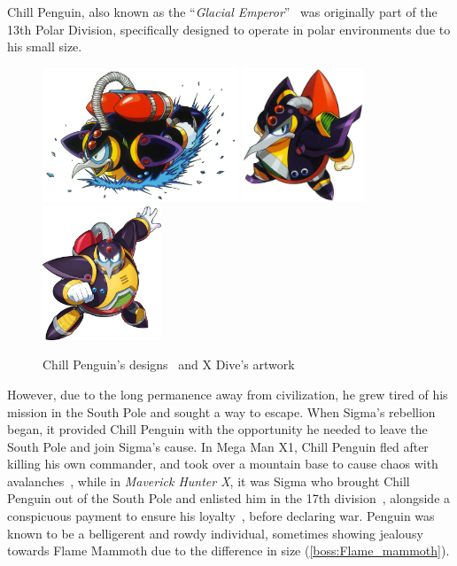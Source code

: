 Chill Penguin, also known as the ``\textit{Glacial Emperor}''~\cite{book:MMX_Complete_art} was originally part of the 13th Polar Division, specifically designed to operate in polar environments due to his small size. 
\begin{figure}[htp]
	\centering
	\includegraphics[height=4cm]{figures/X1/Chill_penguin/Chill_Penguin.jpg}
	\includegraphics[height=4cm]{figures/X1/Chill_penguin/MHXChillPenguin.jpg}
	\includegraphics[height=4cm]{figures/X1/Chill_penguin/Chill_Penguin.png}
	\caption{Chill Penguin's designs~\cite{book:MMX_Complete_art} and X Dive's artwork}
\end{figure}However, due to the long permanence away from civilization, he grew tired of his mission in the South Pole and sought a way to escape. When Sigma's rebellion began, it provided Chill Penguin with the opportunity he needed to leave the South Pole and join Sigma's cause. In Mega Man X1, Chill Penguin fled  after killing his own commander, and took over a mountain base to cause chaos with avalanches~\cite{Xcoll1:Manual_X1}, while in \textit{Maverick Hunter X}, it was Sigma who brought Chill Penguin out of the South Pole and enlisted him in the 17th division~\cite{MHX:manual}, alongside a conspicuous payment to ensure his loyalty~\cite{wiki:MMX_script}, before declaring war. Penguin was known to be a belligerent and rowdy individual, sometimes showing jealousy towards Flame Mammoth due to the difference in size (\ref{boss:Flame_mammoth}).

